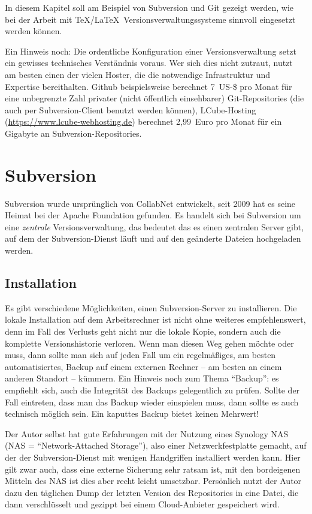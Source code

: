 In diesem Kapitel soll am Beispiel von Subversion und Git gezeigt werden, wie bei der Arbeit mit \TeX/\LaTeX\ Versionsverwaltungssysteme sinnvoll eingesetzt werden können.

Ein Hinweis noch: Die ordentliche Konfiguration einer Versionsverwaltung setzt ein gewisses technisches Verständnis voraus. Wer sich dies nicht zutraut, nutzt am besten einen der vielen Hoster, die die notwendige Infrastruktur und Expertise bereithalten. Github beispielsweise berechnet 7~US-\$ pro Monat für eine unbegrenzte Zahl privater (nicht öffentlich einsehbarer) Git-Repositories (die auch per Subversion-Client benutzt werden können), LCube-Hosting (\url{https://www.lcube-webhosting.de}) berechnet 2,99~Euro pro Monat für ein Gigabyte an Subversion-Repositories.

\section{Subversion}

Subversion wurde ursprünglich von CollabNet entwickelt, seit 2009 hat es seine Heimat bei der Apache Foundation gefunden. Es handelt sich bei Subversion um eine \textit{zentrale} Versionsverwaltung, das bedeutet das es einen zentralen Server gibt, auf dem der Subversion-Dienst läuft und auf den geänderte Dateien hochgeladen werden.

\subsection{Installation}

Es gibt verschiedene Möglichkeiten, einen Subversion-Server zu installieren. Die lokale Installation auf dem Arbeitsrechner ist nicht ohne weiteres empfehlenswert, denn im Fall des Verlusts geht nicht nur die lokale Kopie, sondern auch die komplette Versionshistorie verloren. Wenn man diesen Weg gehen möchte oder muss, dann sollte man sich auf jeden Fall um ein regelmäßiges, am besten automatisiertes, Backup auf einem externen Rechner -- am besten an einem anderen Standort -- kümmern. Ein Hinweis noch zum Thema \enquote{Backup}: es empfiehlt sich, auch die Integrität des Backups gelegentlich zu prüfen. Sollte der Fall eintreten, dass man das Backup wieder einspielen muss, dann sollte es auch technisch möglich sein. Ein kaputtes Backup bietet keinen Mehrwert!

Der Autor selbst hat gute Erfahrungen mit der Nutzung eines Synology NAS (NAS = \enquote{Network-Attached Storage}), also einer Netzwerkfestplatte gemacht, auf der der Subversion-Dienst mit wenigen Handgriffen installiert werden kann. Hier gilt zwar auch, dass eine externe Sicherung sehr ratsam ist, mit den bordeigenen Mitteln des NAS ist dies aber recht leicht umsetzbar. Persönlich nutzt der Autor dazu den täglichen Dump der letzten Version des Repositories in eine Datei, die dann verschlüsselt und gezippt bei einem Cloud-Anbieter gespeichert wird.

